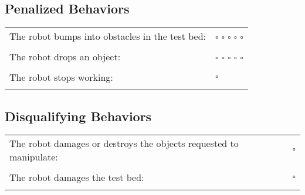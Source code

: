 \subsection*{Penalized Behaviors}
\begin{tabular}{ l l}
The robot bumps into obstacles in the test bed: & $\square$ $\square$ $\square$ $\square$ $\square$ \\ \\
The robot drops an object: & $\square$ $\square$ $\square$ $\square$ $\square$ \\ \\
The robot stops working: & $\square$ \\ \\


\end{tabular}

\subsection*{Disqualifying Behaviors}
\begin{tabular}{ l c}
The robot damages or destroys the objects requested to manipulate: & $\square$ \\ \\
The robot damages the test bed: & $\square$ \\ \\
\end{tabular}


